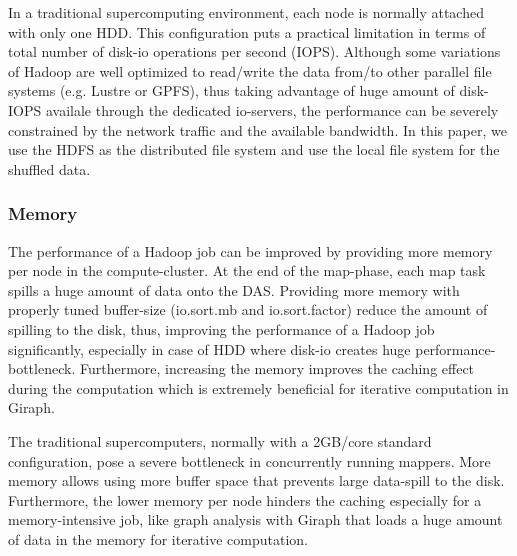 \documentclass[conference]{IEEEtran}
\begin{document}
In a traditional supercomputing environment, each node is normally attached with only one HDD. 
This configuration puts a practical limitation in terms of total number of disk-io operations per second (IOPS).
Although some variations of Hadoop are well optimized to read/write the data from/to other parallel file systems (e.g. Lustre or GPFS), thus taking advantage of huge amount of disk-IOPS availale through the dedicated io-servers, the performance can be severely constrained by the network traffic and the available bandwidth.
In this paper, we use the HDFS as the distributed file system and use the local file system for the shuffled data.

\subsubsection {Memory}
The performance of a Hadoop job can be improved by providing more memory per node in the compute-cluster. 
At the end of the map-phase, each map task spills a huge amount of data onto the DAS. 
Providing more memory with properly tuned buffer-size (io.sort.mb and io.sort.factor) reduce the amount of spilling to the disk, thus, improving the performance of a Hadoop job significantly, especially in case of HDD where disk-io creates huge performance-bottleneck.
Furthermore, increasing the memory improves the caching effect during the computation which is extremely beneficial for iterative computation in Giraph.

The traditional supercomputers, normally with a 2GB/core standard configuration, pose a severe bottleneck in concurrently running mappers.
More memory allows using more buffer space that prevents large data-spill to the disk. 
Furthermore, the lower memory per node hinders the caching especially for a memory-intensive job, like graph analysis with Giraph that loads a huge amount of data in the memory for iterative computation.
\end{document}
